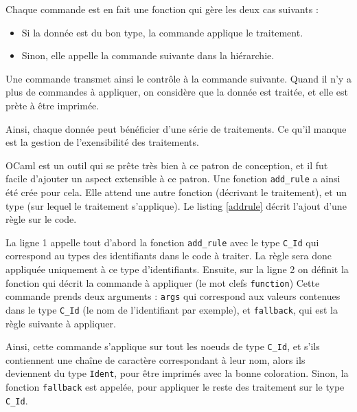 \documentclass[a4paper, 11pt]{report}
\begin{document}
    Chaque commande est en fait une fonction qui gère les deux cas suivants :
    \begin{itemize}
      \item Si la donnée est du bon type, la commande applique le traitement.
      \item Sinon, elle appelle la commande suivante dans la hiérarchie.
    \end{itemize}
    Une commande transmet ainsi le contrôle à la commande suivante.
    Quand il n'y a plus de commandes à appliquer, on considère que la donnée
    est traitée, et elle est prète à être imprimée.

    Ainsi, chaque donnée peut bénéficier d'une série de traitements. Ce qu'il
    manque est la gestion de l'exensibilité des traitements.

    OCaml est un outil qui se prête très bien à ce patron de conception, et il
    fut facile d'ajouter un aspect extensible à ce patron. Une fonction
    \texttt{add\_rule} a ainsi été crée pour cela. Elle attend une autre fonction
    (décrivant le traitement), et un type (sur lequel le traitement s'applique).
    Le listing \ref{addrule} décrit l'ajout d'une règle sur le code.

    

    La ligne 1 appelle tout d'abord la fonction \texttt{add\_rule} avec le type
    \texttt{C\_Id} qui correspond au types des identifiants dans le code à traiter.
    La règle sera donc appliquée uniquement à ce type d'identifiants. Ensuite,
    sur la ligne 2 on définit la fonction qui décrit la commande à appliquer
    (le mot clefs \texttt{function}) Cette commande prends deux arguments :
    \texttt{args} qui correspond aux valeurs contenues dans le type
    \texttt{C\_Id} (le nom de l'identifiant par exemple), et
    \texttt{fallback}, qui est la règle suivante à appliquer.

    Ainsi, cette commande s'applique sur tout les noeuds de type \texttt{C\_Id},
    et s'ils contiennent une chaîne de caractère correspondant à leur nom, alors
    ils deviennent du type \texttt{Ident}, pour être imprimés avec la bonne
    coloration.  Sinon, la fonction \texttt{fallback} est appelée, pour
    appliquer le reste des traitement sur le type \texttt{C\_Id}.
\end{document}
